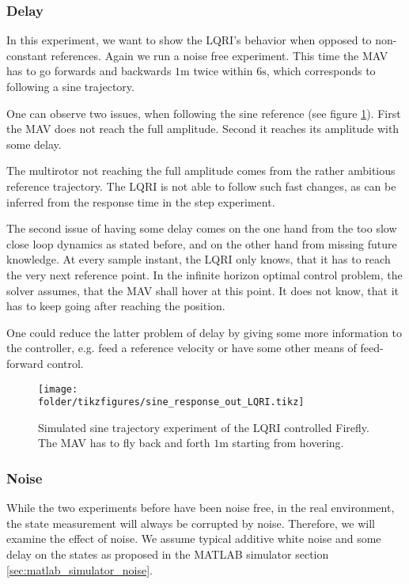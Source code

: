 \subsubsection{Delay}
In this experiment, we want to show the LQRI's behavior when opposed to non-constant references. Again we run a noise free experiment. This time the MAV has to go forwards and backwards $1\si{\metre}$ twice within $6 \si{\second}$, which corresponds to following a sine trajectory.

One can observe two issues, when following the sine reference (see figure \ref{fig:lqri_sine}). First the MAV does not reach the full amplitude. Second it reaches its amplitude with some delay.

The multirotor not reaching the full amplitude comes from the rather ambitious reference trajectory. The LQRI is not able to follow such fast changes, as can be inferred from the response time in the step experiment.

The second issue of having some delay comes on the one hand from the too slow close loop dynamics as stated before, and on the other hand from missing future knowledge. At every sample instant, the LQRI only knows, that it has to reach the very next reference point. In the infinite horizon optimal control problem, the solver assumes, that the MAV shall hover at this point. It does not know, that it has to keep going after reaching the position.

One could reduce the latter problem of delay by giving some more information to the controller, e.g. feed a reference velocity or have some other means of feed-forward control.

\begin{figure}
\centering
\texttt{[image: \\folder/tikzfigures/sine\_response\_out\_LQRI.tikz]}
\caption{Simulated sine trajectory experiment  of the LQRI controlled Firefly. The MAV has to fly back and forth $1\si{\metre}$ starting from hovering. }
\label{fig:lqri_sine}
\end{figure} 

\subsubsection{Noise}
While the two experiments before have been noise free, in the real environment, the state measurement will always be corrupted by noise. Therefore, we will examine the effect of noise. We assume typical additive white noise and some delay on the states as proposed in the MATLAB simulator section \ref{sec:matlab_simulator_noise}.

